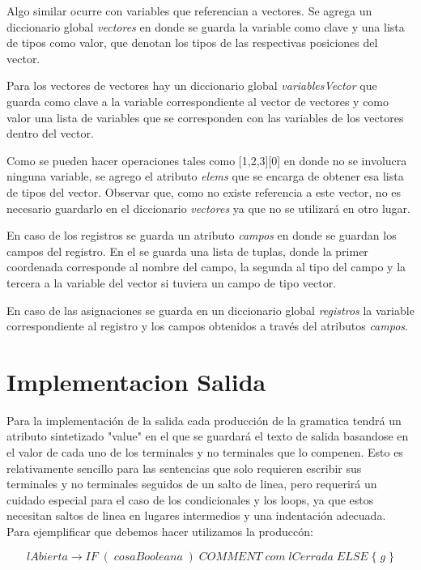 Algo similar ocurre con variables que referencian a  vectores. Se agrega un diccionario global \textit{vectores} en donde se guarda la variable como clave y una lista de tipos como valor, que denotan los tipos de las respectivas posiciones del vector.

Para los vectores de vectores hay un diccionario global \textit{variablesVector} que guarda como clave a la variable correspondiente al vector de vectores y como valor una lista de variables que se corresponden con las variables de los vectores dentro del vector.

Como se pueden hacer operaciones tales como [1,2,3][0] en donde no se involucra ninguna variable, se agrego el atributo \textit{elems} que se encarga de obtener esa lista de tipos del vector. Observar que, como no existe referencia a este vector, no es necesario guardarlo en el diccionario \textit{vectores} ya que no se utilizará en otro lugar.

En caso de los registros se guarda un atributo \textit{campos} en donde se guardan los campos del registro. En el se guarda una lista de tuplas, donde la primer coordenada corresponde al nombre del campo, la segunda al tipo del campo y la tercera a la variable del vector si tuviera un campo de tipo vector.

En caso de las asignaciones se guarda en un diccionario global \textit{registros} la variable correspondiente al registro y los campos obtenidos a través del atributos \textit{campos}.


\section{Implementacion Salida}

Para la implementación de la salida cada producción de la gramatica tendrá un atributo sintetizado "value" en el que se guardará el texto de salida basandose en el valor de cada uno de los terminales y no terminales que lo compenen. Esto es relativamente sencillo para las sentencias que solo requieren escribir sus terminales y no terminales seguidos de un salto de linea, pero requerirá un cuidado especial para el caso de los condicionales y los loops, ya que estos necesitan saltos de linea en lugares intermedios y una indentación adecuada.
\\
Para ejemplificar que debemos hacer utilizamos la produccón:

$$lAbierta \rightarrow IF\; (\; cosaBooleana\; )\; COMMENT\; com\; lCerrada\; ELSE\; \{\; g\; \}$$ 

